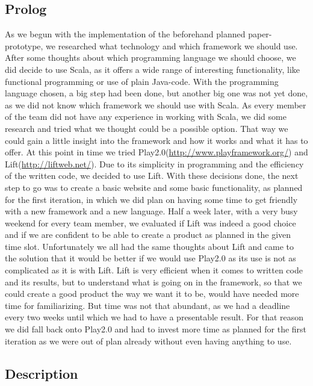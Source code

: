\subsection{Prolog}\label{ssec:WebProlog}

As we begun with the implementation of the beforehand planned paper-prototype, we researched what technology and which
framework we should use.
After some thoughts about which programming language we should choose, we did decide to use Scala, as it offers a wide range of
interesting functionality, like functional programming or use of plain Java-code.
With the programming language chosen, a big step had been done, but another big one was not yet done, as we did not know which
framework we should use with Scala. As every member of the team did not have any experience in working with Scala, we did some
research and tried what we thought could be a possible option. That way we could gain a little insight into the framework and how
it works and what it has to offer. At this point in time we tried Play2.0(\url{http://www.playframework.org/}) and
Lift(\url{http://liftweb.net/}). Due to its simplicity in programming and the efficiency of the written code, we decided to use
Lift.\newline
With these decisions done, the next step to go was to create a basic website and some basic functionality, as planned for the
first iteration, in which we did plan on having some time to get friendly with a new framework and a new language.
Half a week later, with a very busy weekend for every team member, we evaluated if Lift was indeed a good choice and if we are
confident to be able to create a product as planned in the given time slot.
Unfortunately we all had the same thoughts about Lift and came to the solution that it would be better if we would use Play2.0 as
its use is not as complicated as it is with Lift. Lift is very efficient when it comes to written code and its results, but to
understand what is going on in the framework, so that we could create a good product the way we want it to be, would have needed
more time for familiarizing. But time was not that abundant, as we had a deadline every two weeks until which we had to have a
presentable result.
For that reason we did fall back onto Play2.0 and had to invest more time as planned for the first iteration as we were out of
plan already without even having anything to use.

\subsection{Description}\label{ssec:WebDesc}

